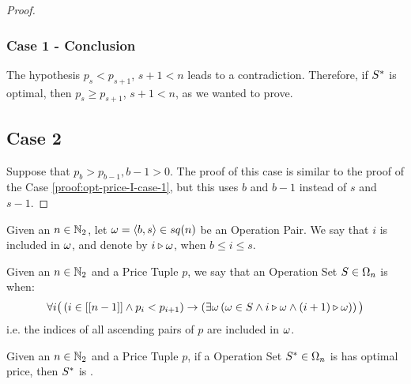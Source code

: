 \begin{proof}
    \subsubsection*{Case 1 - Conclusion}
    The hypothesis $p_s < p_{s+1}$, $s+1 < n$ leads to a contradiction. Therefore, if $S^{*}$ is optimal, then $p_s \geqslant p_{s+1}$, $s+1 < n$, as we wanted to prove.

    \subsection*{Case 2}
    Suppose that $p_b > p_{b-1}, b-1 > 0$. The proof of this case is similar to the proof of the Case \ref{proof:opt-price-I-case-1}, but this uses $b$ and $b-1$ instead of $s$ and $s-1$.
\end{proof}

\begin{defn}
    Given an $n \in \mathbb{N}_{2}$, let $\omega = \left\langle b, s \right\rangle \in sq({n})$ be an Operation Pair. We say that $i$ is included in $\omega$, and denote by $i \triangleright \omega$, when $b \leqslant i \leqslant s$.
\end{defn}

\begin{defn}
    Given an $n \in \mathbb{N}_{2}$ and a Price Tuple $p$, we say that an Operation Set $S \in \Omega_{n}$ is \great when:
    \begin{equation}
        \forall i \big(
            \left( i \in \left[\left[ n-1 \right]\right] \land p_{i} < p_{i+1}  \right)
            \rightarrow
            \left( \exists \omega \left(
                \omega \in S \land i \triangleright \omega \land (i+1) \triangleright \omega
            \right) \right)
        \big)
    \end{equation}
    i.e. the indices of all ascending pairs of $p$ are included in $\omega$.
\end{defn}

\begin{lemma}
    \label{lemma:opt-price-II}
    Given an $n \in \mathbb{N}_{2}$ and a Price Tuple $p$, if a Operation Set $S^{*} \in \Omega_{n}$ is has optimal price, then $S^{*}$ is \great.
\end{lemma}


